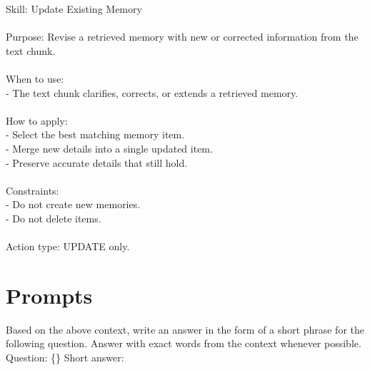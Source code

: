 \begin{center}
\begin{tcolorbox}[
  title={Evolved Skill on ALFWorld - UPDATE},
  colback=orange!6,
  colframe=orange!75!black,
  coltitle=black
]
{
Skill: Update Existing Memory \\\\
Purpose: Revise a retrieved memory with new or corrected information from the text chunk. \\\\
When to use: \\
- The text chunk clarifies, corrects, or extends a retrieved memory. \\\\
How to apply: \\
- Select the best matching memory item. \\
- Merge new details into a single updated item. \\
- Preserve accurate details that still hold. \\\\
Constraints: \\
- Do not create new memories. \\
- Do not delete items. \\\\
Action type: UPDATE only.
}
\label{appendix:case_update}
\end{tcolorbox}
\end{center}










\section{Prompts}
\label{appendix:prompts}






\begin{center}
\begin{tcolorbox}[title={LoCoMo Answer Prompt}]
{
Based on the above context, write an answer in the form of a short phrase for the following question. Answer with exact words from the context whenever possible. \\

Question: \{\} Short answer:
}
\label{appendix:case_locomo}
\end{tcolorbox}
\end{center}





